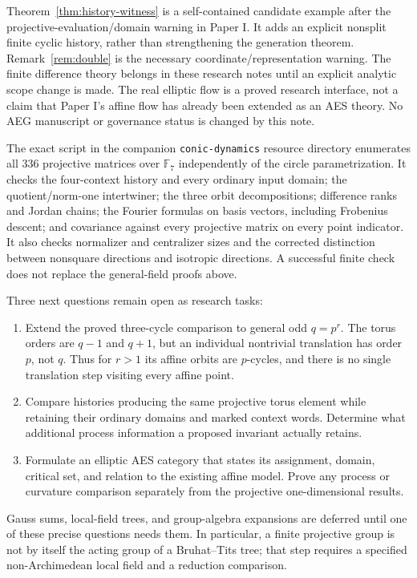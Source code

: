 \documentclass[11pt]{article}
\theoremstyle{definition}
\theoremstyle{remark}
\newcommand{\F}{\mathbb F}
\begin{document}
Theorem~\ref{thm:history-witness} is a self-contained candidate example after
the projective-evaluation/domain warning in Paper I. It adds an explicit
nonsplit finite cyclic history, rather than strengthening the generation
theorem. Remark~\ref{rem:double} is the necessary coordinate/representation
warning. The finite difference theory belongs in these research notes until
an explicit analytic scope change is made. The real elliptic flow is a proved
research interface, not a claim that Paper I's affine flow has already been
extended as an AES theory. No AEG manuscript or governance status is changed
by this note.

The exact script in the companion \texttt{conic-dynamics} resource directory enumerates all $336$ projective matrices
over $\F_7$ independently of the circle parametrization. It checks the
four-context history and every ordinary input domain; the quotient/norm-one
intertwiner; the three orbit decompositions; difference ranks and Jordan
chains; the Fourier formulas on basis vectors, including Frobenius descent;
and covariance against every projective matrix on every point indicator.
It also checks normalizer and centralizer sizes and the corrected distinction
between nonsquare directions and isotropic directions. A successful finite
check does not replace the general-field proofs above.

Three next questions remain open as research tasks:
\begin{enumerate}
\item Extend the proved three-cycle comparison to general odd $q=p^r$.
The torus orders are $q-1$ and $q+1$, but an individual nontrivial translation
has order $p$, not $q$. Thus for $r>1$ its affine orbits are $p$-cycles, and
there is no single translation step visiting every affine point.
\item Compare histories producing the same projective torus element while
retaining their ordinary domains and marked context words. Determine what
additional process information a proposed invariant actually retains.
\item Formulate an elliptic AES category that states its assignment, domain,
critical set, and relation to the existing affine model. Prove any process or
curvature comparison separately from the projective one-dimensional results.
\end{enumerate}
Gauss sums, local-field trees, and group-algebra expansions are deferred until
one of these precise questions needs them. In particular, a finite projective
group is not by itself the acting group of a Bruhat--Tits tree; that step
requires a specified non-Archimedean local field and a reduction comparison.
\end{document}
